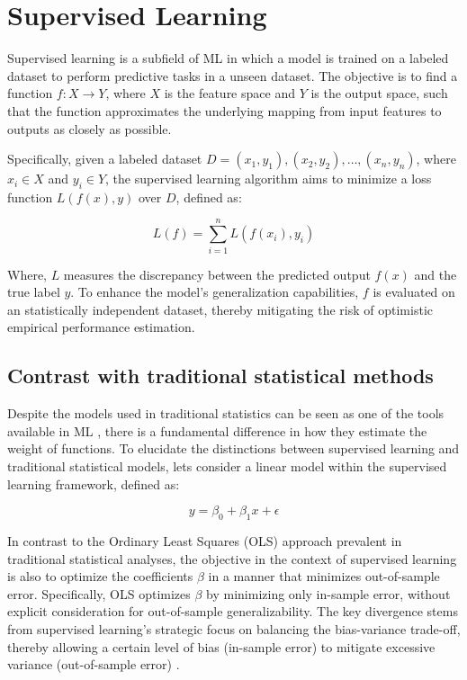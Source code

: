 \section{Supervised Learning }

Supervised learning is a subfield of \gls{ML} in which a model is trained on a labeled dataset to perform predictive tasks in a unseen dataset. The objective is to find a function \( f: X \rightarrow Y \), where \( X \) is the feature space and \(Y\) is the output space, such that the function approximates the underlying mapping from input features to outputs as closely as possible.

Specifically, given a labeled dataset \(D = {(x_1, y_1), (x_2, y_2), \ldots, (x_n, y_n)} \), where \( x_i \in X \) and \( y_i \in Y \), the supervised learning algorithm aims to minimize a loss function \( L(f(x), y) \) over \( D\), defined as:

\[
L(f) = \sum_{i=1}^{n} L(f(x_i), y_i)
\]

Where, \(L\) measures the discrepancy between the predicted output \( f(x) \) and the true label \( y \). To enhance the model's generalization capabilities, $f$ is evaluated on an statistically independent dataset, thereby mitigating the risk of optimistic empirical performance estimation.

\subsection{Contrast with traditional statistical methods}

Despite the models used in traditional statistics can be seen as one of the tools available in \gls{ML} \cite{TrevorHastieRobertTibshirani2014AssessmentSelection}, there is a fundamental difference in how they estimate the weight of functions. To elucidate the distinctions between supervised learning and traditional statistical models, lets consider a linear model within the supervised learning framework, defined as:

\begin{equation}
y = \beta_0 + \beta_1 x + \epsilon
\label{lm}
\end{equation}

In contrast to the Ordinary Least Squares (OLS) approach prevalent in traditional statistical analyses, the objective in the context of supervised learning is also to optimize the coefficients $\beta$ in a manner that minimizes out-of-sample error. Specifically, OLS optimizes \( \beta \) by minimizing only in-sample error, without explicit consideration for out-of-sample generalizability. The key divergence stems from supervised learning's strategic focus on balancing the bias-variance trade-off, thereby allowing a certain level of bias (in-sample error) to mitigate excessive variance (out-of-sample error) \cite{Athey2019MachineAbout}.


